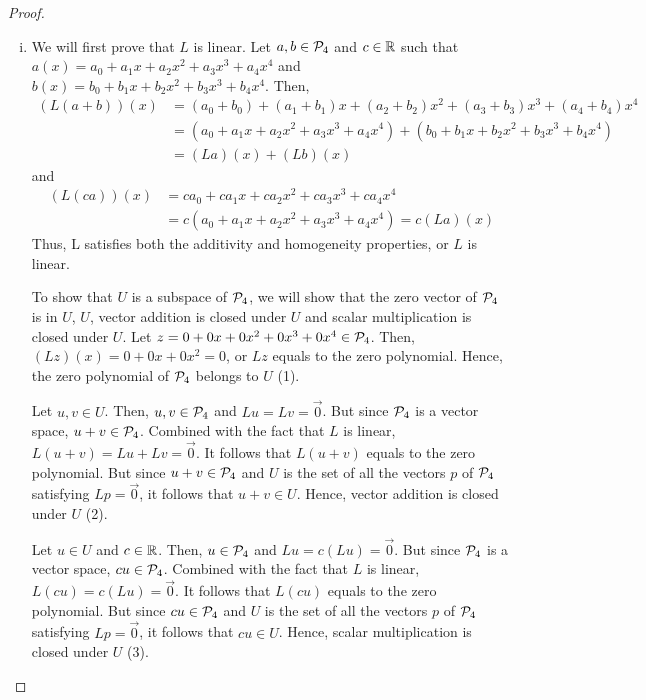 \begin{proof}
	\renewcommand{\qedsymbol}{$\blacksquare$}
	\begin{enumerate}[(i)]
		\item We will first prove that $L$ is linear. Let $a,b\in\P_4$ and $c\in\R$ such that $a(x)=a_0+a_1x+a_2x^2+a_3x^3+a_4x^4$ and $b(x)=b_0+b_1x+b_2x^2+b_3x^3+b_4x^4$. Then,
		      \begin{equation*}
			      \begin{aligned}
				      (L(a+b))(x)
				       & = (a_0+b_0)+(a_1+b_1)x+(a_2+b_2)x^2+(a_3+b_3)x^3+(a_4+b_4)x^4     \\
				       & = (a_0+a_1x+a_2x^2+a_3x^3+a_4x^4)+(b_0+b_1x+b_2x^2+b_3x^3+b_4x^4) \\
				       & =(La)(x)+(Lb)(x)
			      \end{aligned}
		      \end{equation*}
		      and
		      \begin{equation*}
			      \begin{aligned}
				      (L(ca))(x)
				       & = ca_0+ca_1x+ca_2x^2+ca_3x^3+ca_4x^4        \\
				       & = c(a_0+a_1x+a_2x^2+a_3x^3+a_4x^4)=c(La)(x)
			      \end{aligned}
		      \end{equation*}
		      Thus, L satisfies both the additivity and homogeneity properties, or $L$ is linear.

		      To show that $U$ is a subspace of $\P_4$, we will show that the zero vector of $\P_4$ is in $U$, $U$, vector addition is closed under $U$ and scalar multiplication is closed under $U$.
		      Let $z=0+0x+0x^2+0x^3+0x^4\in\P_4$. Then, $(Lz)(x)=0+0x+0x^2=0$, or $Lz$ equals to the zero polynomial. Hence, the zero polynomial of $\P_4$ belongs to $U$ (1).

		      Let $u,v\in U$.
			  Then, $u,v\in\P_4$ and $Lu=Lv=\vec{0}$.
			  But since $\P_4$ is a vector space, $u+v\in\P_4$.
			  Combined with the fact that $L$ is linear, $L(u+v)=Lu+Lv=\vec{0}$. 
			  It follows that $L(u+v)$ equals to the zero polynomial. 
			  But since $u+v\in\P_4$ and $U$ is the set of all the vectors $p$ of $\P_4$ satisfying $Lp=\vec{0}$, it follows that $u+v\in U$.
			  Hence, vector addition is closed under $U$ (2).

			  Let $u\in U$ and $c\in\R$.
			  Then, $u\in\P_4$ and $Lu=c(Lu)=\vec{0}$.
			  But since $\P_4$ is a vector space, $cu\in\P_4$.
			  Combined with the fact that $L$ is linear, $L(cu)=c(Lu)=\vec{0}$.
			  It follows that $L(cu)$ equals to the zero polynomial.
			  But since $cu\in\P_4$ and $U$ is the set of all the vectors $p$ of $\P_4$ satisfying $Lp=\vec{0}$, it follows that $cu\in U$.
			  Hence, scalar multiplication is closed under $U$ (3).
			  

\end{enumerate}
\end{proof}

